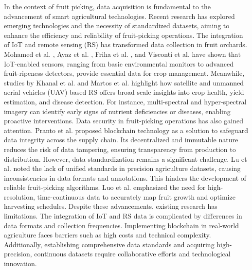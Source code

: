 \documentclass[a4paper,fleqn]{cas-dc}
\begin{document}
In the context of fruit picking, data acquisition is fundamental to the advancement of smart agricultural technologies. Recent research has explored emerging technologies and the necessity of standardized datasets, aiming to enhance the efficiency and reliability of fruit-picking operations.
The integration of IoT and remote sensing (RS) has transformed data collection in fruit orchards. Mohamed et al. \cite{mohamed2021smart}, Ayaz et al. \cite{ayaz2019internet}, Friha et al. \cite{friha2021internet}, and Visconti et al. \cite{visconti2020development} have shown that IoT-enabled sensors, ranging from basic environmental monitors to advanced fruit-ripeness detectors, provide essential data for crop management. Meanwhile, studies by Khanal et al. \cite{khanal2020remote} and Martos et al. \cite{martos2021ensuring} highlight how satellite and unmanned aerial vehicles (UAV)-based RS offers broad-scale insights into crop health, yield estimation, and disease detection. For instance, multi-spectral and hyper-spectral imagery can identify early signs of nutrient deficiencies or diseases, enabling proactive interventions.
Data security in fruit-picking operations has also gained attention. Pranto et al. \cite{pranto2021blockchain} proposed blockchain technology as a solution to safeguard data integrity across the supply chain. Its decentralized and immutable nature reduces the risk of data tampering, ensuring transparency from production to distribution.
However, data standardization remains a significant challenge. Lu et al. \cite{lu2020survey} noted the lack of unified standards in precision agriculture datasets, causing inconsistencies in data formats and annotations. This hinders the development of reliable fruit-picking algorithms. Luo et al. \cite{luo2020identifying} emphasized the need for high-resolution, time-continuous data to accurately map fruit growth and optimize harvesting schedules.
Despite these advancements, existing research has limitations. The integration of IoT and RS data is complicated by differences in data formats and collection frequencies. Implementing blockchain in real-world agriculture faces barriers such as high costs and technical complexity. Additionally, establishing comprehensive data standards and acquiring high-precision, continuous datasets require collaborative efforts and technological innovation.
\end{document}
